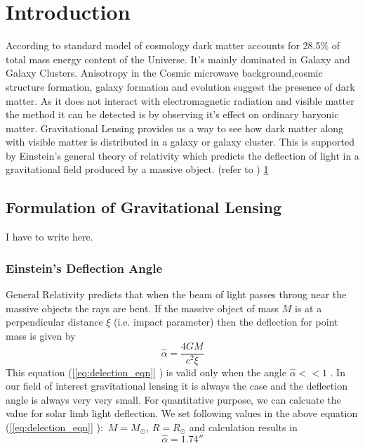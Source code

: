 \documentclass[12pt, preprint,letterpaper]{article}
\begin{document}
\section{Introduction}\label{sec:sec1}
According to standard model of cosmology dark matter accounts for  28.5\% of total mass energy content of the Universe.
It's mainly dominated in Galaxy and Galaxy Clusters.
Anisotropy in the Cosmic microwave background,cosmic
structure formation, galaxy formation
and evolution suggest the presence of dark matter.
As it does not interact with electromagnetic radiation and
visible matter the method it can  be detected is by observing
it's effect on ordinary baryonic matter.
%
%
%
Gravitational Lensing provides us a way
to see how dark matter along with visible matter is distributed
in a galaxy or galaxy cluster.
This is supported by Einstein's general theory of relativity
which predicts the deflection of light in a gravitational field
produced by a massive object. (refer to \cite{fabian12})
\ref{sec:sec1}
%
%
%
%
\subsection{ Formulation of Gravitational Lensing}\label{subsec:lensing}
I have to write here.

\subsubsection{Einstein's Deflection Angle}\label{subsubsec:lensing}
General Relativity predicts that when the beam of light passes throug near
the massive objects the rays are bent. If the massive object of mass $M$ is at a
perpendicular distance $\xi$ (i.e. impact parameter) then the deflection for point
mass is given by
\begin{equation}\label{[eq:delection_eqn]}
\hat{\alpha} = \frac{4GM}{c^2\xi}
\end{equation}
This equation (\ref*{[eq:delection_eqn]} ) is valid only when the angle
 $\hat{\alpha} <<1  $ . In  our field of interest gravitational lensing it is always the
 case and the deflection angle is always very very small. For quantitative purpose,
 we can calcuate the value for solar limb light deflection.
 We set following values in the above equation (\ref*{[eq:delection_eqn]} ):\
 $M = M_{\odot}$, $ R = R_{\odot}$ and calculation results in \
 \begin{equation}\label{[eq:delection_eqn]}
 \hat{\alpha} = 1.74''
 \end{equation}
\end{document}
